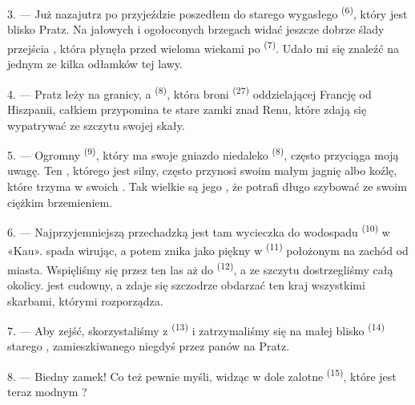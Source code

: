\VUsaut{3.0mm}
\VUsaut{3.0mm}

3. --- Już nazajutrz po przyjeździe poszedłem do starego wygasłego 
\textsuperscript{(6)}, który jest blisko Pratz. Na jałowych i ogołoconych brzegach
 widać jeszcze dobrze ślady przejścia , która płynęła przed
wieloma wiekami po  \textsuperscript{(7)}. Udało mi się znaleźć na
jednym ze  kilka odłamków tej lawy.

4. --- Pratz leży na granicy, a  \textsuperscript{(8)}, która broni
 \textsuperscript{(27)} oddzielającej Francję od Hiszpanii, całkiem
przypomina te stare zamki znad Renu, które zdają się wypatrywać  ze szczytu
swojej skały.

5. --- Ogromny  \textsuperscript{(9)}, który ma swoje gniazdo niedaleko
 \textsuperscript{(8)}, często przyciąga moją uwagę. Ten , którego  jest silny, często przynosi swoim małym jagnię albo
koźlę, które trzyma w swoich . Tak wielkie są jego , że
potrafi długo szybować ze swoim ciężkim brzemieniem.

\VUsaut{3.0mm}
\VUsaut{3.0mm}

6. --- Najprzyjemniejszą przechadzką jest tam wycieczka do wodospadu
\textsuperscript{(10)} w «Kau».  spada wirując, a potem znika jako piękny
 w  \textsuperscript{(11)} położonym na zachód od
miasta. Wspięliśmy się przez ten las aż do 
\textsuperscript{(12)}, a ze szczytu  dostrzegliśmy całą
 okolicy.  jest cudowny, a  zdaje się
szczodrze obdarzać ten kraj wszystkimi skarbami, którymi rozporządza.

7. --- Aby zejść, skorzystaliśmy z  \textsuperscript{(13)} i
zatrzymaliśmy się na małej  blisko  \textsuperscript{(14)}
starego , zamieszkiwanego niegdyś przez panów na Pratz.

8. --- Biedny zamek! Co też pewnie myśli, widząc w dole zalotne 
\textsuperscript{(15)}, które jest teraz modnym ?

